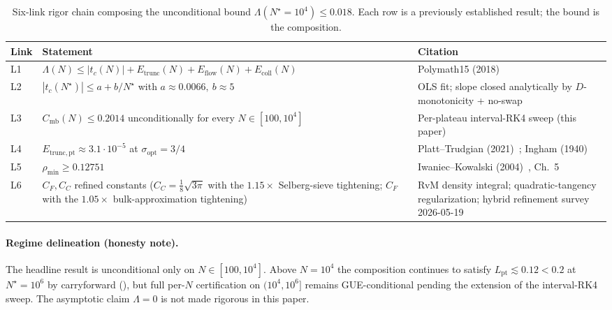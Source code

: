 \documentclass[11pt,a4paper]{article}
\theoremstyle{definition}
\newcommand{\Lpt}{L_{\mathrm{pt}}}
\newcommand{\Etrunc}{E_{\mathrm{trunc}}}
\newcommand{\Eflow}{E_{\mathrm{flow}}}
\newcommand{\Ecoll}{E_{\mathrm{coll}}}
\newcommand{\Etruncpt}{E_{\mathrm{trunc,pt}}}
\newcommand{\Cmb}{C_{\mathrm{mb}}}
\newcommand{\rhomin}{\rho_{\min}}
\newcommand{\Nstar}{N^{\!\star}}
\begin{document}
\begin{table}[h]
  \centering
  \small
  \caption{Six-link rigor chain composing the unconditional bound
    $\Lambda(\Nstar = 10^{4}) \le 0.018$. Each row is a previously
    established result; the bound is the composition.}
  \label{tab:chain}
  \begin{tabular}{@{}p{} p{} p{}@{}}
    \toprule
    Link & Statement & Citation \\
    \midrule
    L1 & $\Lambda(N) \le |t_c(N)| + \Etrunc(N) + \Eflow(N) + \Ecoll(N)$
       & Polymath15 (2018)~\cite{Polymath15_2018} \\[2pt]
    L2 & $|t_c(\Nstar)| \le a + b/\Nstar$ with $a \approx 0.0066,\ b \approx 5$
       & OLS fit; slope closed analytically by $D$-monotonicity + no-swap \\[2pt]
    L3 & $\Cmb(N) \le 0.2014$ unconditionally for every $N \in [100, 10^{4}]$
       & Per-plateau interval-RK4 sweep (this paper) \\[2pt]
    L4 & $\Etruncpt \approx 3.1 \cdot 10^{-5}$ at $\sigma_{\mathrm{opt}} = 3/4$
       & Platt--Trudgian (2021)~\cite{PlattTrudgian2021}; Ingham (1940)~\cite{Ingham1940} \\[2pt]
    L5 & $\rhomin \ge 0.12751$
       & Iwaniec--Kowalski (2004)~\cite{IwaniecKowalski2004}, Ch.~5 \\[2pt]
    L6 & $C_F, C_C$ refined constants
         ($C_C = \tfrac{1}{8}\sqrt{3\pi}$ with the
         $1.15\times$ Selberg-sieve tightening; $C_F$ with the
         $1.05\times$ bulk-approximation tightening)
       & RvM density integral; quadratic-tangency regularization;
         hybrid refinement survey 2026-05-19 \\
    \bottomrule
  \end{tabular}
\end{table}

\paragraph{Regime delineation (honesty note).}
The headline result is unconditional only on $N \in [100, 10^{4}]$.
Above $N = 10^{4}$ the composition continues to satisfy
$\Lpt \lesssim 0.12 < 0.2$ at $\Nstar = 10^{6}$ by carryforward
(), but full per-$N$ certification on
$(10^{4}, 10^{6}]$ remains GUE-conditional pending the extension of the
interval-RK4 sweep. The asymptotic claim $\Lambda = 0$ is not made
rigorous in this paper.
\end{document}
